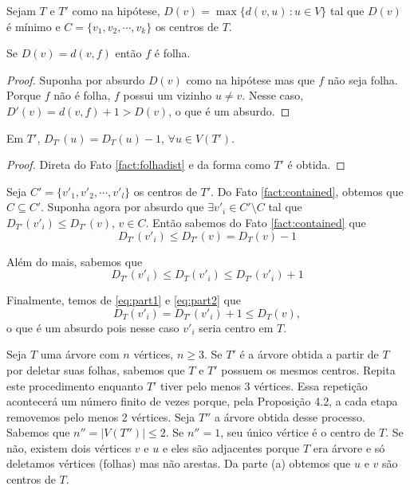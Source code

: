 
 Sejam $T$ e $T'$ como na hipótese, $D(v) = \max\{d(v,u) \, : u \in V\}$
tal que $D(v)$ é mínimo e $C = \{v_1, v_2, \cdots, v_k\}$ os centros de $T$.

\begin{fact}
\label{fact:folhadist}
Se $D(v) = d(v, f)$ então $f$ é folha.
\end{fact}

\begin{proof} Suponha por absurdo $D(v)$ como na hipótese mas que $f$ não seja
folha. Porque $f$ não é folha, $f$ possui um vizinho $u \ne v$. Nesse caso,
$D'(v) = d(v, f) + 1 > D(v)$, o que é um absurdo.
\end{proof}

\begin{fact}
\label{fact:contained}
Em $T'$, $D_{T'}(u) = D_T(u) - 1$, $\forall u \in V(T')$.
\end{fact}

\begin{proof} Direta do Fato \ref{fact:folhadist} e da forma como $T'$ é obtida.
\end{proof}

Seja $C' = \{v'_1, v'_2, \cdots, v'_l\}$ os centros de $T'$. Do Fato
\ref{fact:contained}, obtemos que $C \subseteq C'$. Suponha agora por absurdo que
$\exists v'_i \in C' \setminus C$ tal que $D_{T'}(v'_i) \le D_{T'}(v)$, $v \in C$.
Então sabemos do Fato \ref{fact:contained} que
\begin{equation}
\label{eq:part1}
D_{T'}(v'_i) \le D_{T'}(v) = D_T(v) - 1
\end{equation}

Além do mais, sabemos que
\begin{equation}
\label{eq:part2}
D_{T'}(v'_i) \le D_T(v'_i) \le D_{T'}(v'_i) + 1
\end{equation}

Finalmente, temos de \eqref{eq:part1} e \eqref{eq:part2} que
\[D_T(v'_i) = D_{T'}(v'_i) + 1 \le D_T(v),\] o que é um absurdo pois nesse caso
$v'_i$ seria centro em $T$.
\fimprova


Seja $T$ uma árvore com $n$ vértices, $n \ge 3$. Se $T'$ é a árvore obtida a
partir de $T$ por deletar suas folhas, sabemos que $T$ e $T'$ possuem os mesmos
centros. Repita este procedimento enquanto $T'$ tiver pelo menos 3 vértices.
Essa repetição acontecerá um número finito de vezes porque, pela Proposição
4.2, a cada etapa removemos pelo menos 2 vértices. Seja $T''$ a árvore obtida
desse processo. Sabemos que $n'' = |V(T'')| \le 2$. Se $n'' = 1$, seu único
vértice é o centro de $T$. Se não, existem dois vértices $v$ e $u$ e eles são
adjacentes porque $T$ era árvore e só deletamos vértices (folhas) mas não
arestas. Da parte (a) obtemos que $u$ e $v$ são centros de $T$.
\fimprova

